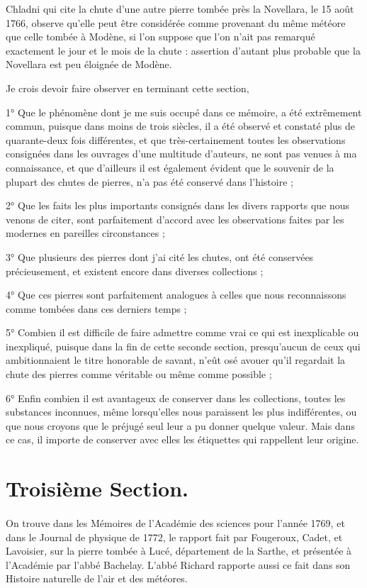 \documentclass[a4paper, 12pt, oneside, french]{article}
\begin{document}
Chladni qui cite la chute d'une autre pierre tombée près la Novellara, le 15 août 1766, observe qu'elle peut être considérée comme provenant du même météore que celle tombée à Modène, si l'on suppose que l'on n'ait pas remarqué exactement le jour et le mois de la chute : assertion d'autant plus probable que la Novellara est peu éloignée de Modène.

Je crois devoir faire observer en terminant cette section,

1° Que le phénomène dont je me suis occupé dans ce mémoire, a été extrêmement commun, puisque dans moins de trois siècles, il a été observé et constaté plus de quarante-deux fois différentes, et que très-certainement toutes les observations consignées dans les ouvrages d'une multitude d'auteurs, ne sont pas venues à ma connaissance, et que d'ailleurs il est également évident que le souvenir de la plupart des chutes de pierres, n'a pas été conservé dans l'histoire ;

2° Que les faits les plus importants consignés dans les divers rapports que nous venons de citer, sont parfaitement d'accord avec les observations faites par les modernes en pareilles circonstances ;

3° Que plusieurs des pierres dont j'ai cité les chutes, ont été conservées précieusement, et existent encore dans diverses collections ;

4° Que ces pierres sont parfaitement analogues à celles que nous reconnaissons comme tombées dans ces derniers temps ;

5° Combien il est difficile de faire admettre comme vrai ce qui est inexplicable ou inexpliqué, puisque dans la fin de cette seconde section, presqu'aucun de ceux qui ambitionnaient le titre honorable de savant, n'eût osé avouer qu'il regardait la chute des pierres comme véritable ou même comme possible ;

6° Enfin combien il est avantageux de conserver dans les collections, toutes les substances inconnues, même lorsqu'elles nous paraissent les plus indifférentes, ou que nous croyons que le préjugé seul leur a pu donner quelque valeur. Mais dans ce cas, il importe de conserver avec elles les étiquettes qui rappellent leur origine.
\clearpage
\section{Troisième Section.}
\paragraph{}
On trouve dans les Mémoires de l'Académie des sciences pour l'année 1769, et dans le Journal de physique de 1772, le rapport fait par Fougeroux, Cadet, et Lavoisier, sur la pierre tombée à Lucé, département de la Sarthe, et présentée à l'Académie par l'abbé Bachelay. L'abbé Richard rapporte aussi ce fait dans son Histoire naturelle de l'air et des météores.
\end{document}
